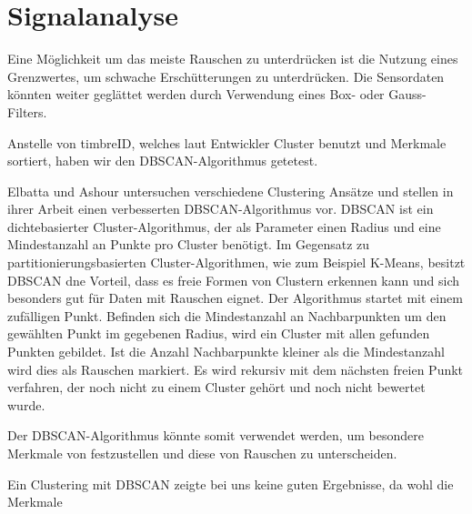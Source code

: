 \section*{Signalanalyse}

Eine Möglichkeit um das meiste Rauschen zu unterdrücken ist die Nutzung eines Grenzwertes, um schwache Erschütterungen zu unterdrücken.
Die Sensordaten könnten weiter geglättet werden durch Verwendung eines Box- oder Gauss-Filters.

Anstelle von timbreID, welches laut Entwickler \cite{timbreID} Cluster benutzt und Merkmale sortiert, haben wir den DBSCAN-Algorithmus getetest.

Elbatta und Ashour untersuchen verschiedene Clustering Ansätze und stellen in ihrer Arbeit \cite{Elbatta2013ADM} einen verbesserten DBSCAN-Algorithmus vor.
DBSCAN ist ein  dichtebasierter Cluster-Algorithmus, der als Parameter einen Radius und eine Mindestanzahl an Punkte pro Cluster benötigt.
Im Gegensatz zu partitionierungsbasierten Cluster-Algorithmen, wie zum Beispiel K-Means, besitzt DBSCAN dne Vorteil, dass es freie Formen von Clustern erkennen kann und sich besonders gut für Daten mit Rauschen eignet.
Der Algorithmus startet mit einem zufälligen Punkt.
Befinden sich die Mindestanzahl an Nachbarpunkten um den gewählten Punkt im gegebenen Radius, wird ein Cluster mit allen gefunden Punkten gebildet.
Ist die Anzahl Nachbarpunkte kleiner als die Mindestanzahl wird dies als Rauschen markiert.
Es wird rekursiv mit dem nächsten freien Punkt verfahren, der noch nicht zu einem Cluster gehört und noch nicht bewertet wurde.

Der DBSCAN-Algorithmus könnte somit verwendet werden, um besondere Merkmale von festzustellen und diese von Rauschen zu unterscheiden.

Ein Clustering mit DBSCAN zeigte bei uns keine guten Ergebnisse, da wohl die Merkmale
